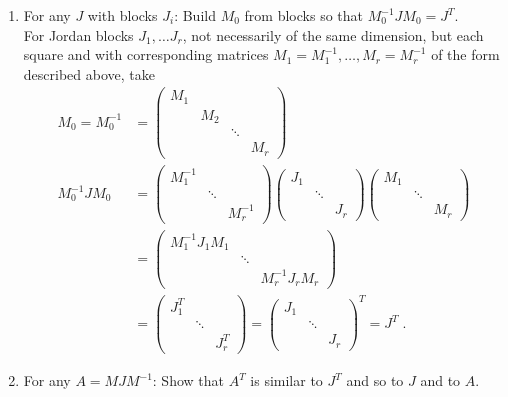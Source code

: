 \documentclass[a4paper]{article}
\begin{document}
\begin{enumerate}
\begin{enumerate}
	\item For any $J$ with blocks $J_i$: Build $M_0$ from blocks
	so that $M_0^{-1} J M_0 = J^T$. \\
	
	For Jordan blocks $J_1, \dots J_r$, not necessarily of the
	same dimension, but each square and with corresponding
	matrices $M_1 = M_1^{-1}, \dots , M_r = M_r^{-1}$ of the form
	described above, take
	\begin{align*}
	M_0 = M_0^{-1} &= \begin{pmatrix} 
	M_1 & & & \\ & M_2 & & \\ & & \ddots & \\
	& & & M_r \end{pmatrix} \\
	M_0^{-1}JM_0 &= 
	\begin{pmatrix}
	M_1^{-1} & & \\ & \ddots & \\ & & M_r^{-1}
	\end{pmatrix}
	\begin{pmatrix}
	J_1 & & \\ & \ddots & \\ & & J_r
	\end{pmatrix}
	\begin{pmatrix}
	M_1 & & \\ & \ddots & \\ & & M_r
	\end{pmatrix}\\
	&= \begin{pmatrix}
	M_1^{-1}J_1M_1 & & \\ & \ddots & \\ & & M_r^{-1}J_rM_r
	\end{pmatrix} \\
	& = \begin{pmatrix}
	J_1^T & & \\ & \ddots & \\ & & J_r^T
	\end{pmatrix} = \begin{pmatrix}
	J_1 & & \\ & \ddots & \\ & & J_r
	\end{pmatrix}^T = J^T \;.
	\end{align*}
	
	\item For any $A = M J M^{-1}$: Show that $A^T$ is similar to
	$J^T$ and so to $J$ and to $A$. \\
	

\end{enumerate}
\end{enumerate}
\end{document}
